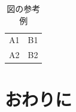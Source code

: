 \documentclass{jarticle}
\begin{document}
\begin{table}[tbh]
 \begin{center}
  \begin{tabular}{|l|r|} \hline
  A1 & B1 \\
  A2 & B2 \\ \hline
  \end{tabular}
  \caption{図の参考例}
  \label{table:sample}
 \end{center}
\end{table}

\section{おわりに}

\small


\normalsize
\end{document}
